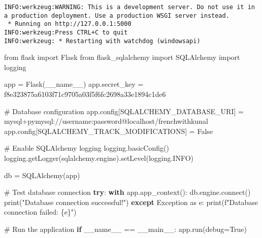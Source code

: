 \documentclass[
  letterpaper,
  DIV=11,
  numbers=noendperiod]{scrreprt}
\newenvironment{Shaded}{\begin{snugshade}}{\end{snugshade}}
\newcommand{\BuiltInTok}[1]{\textcolor[rgb]{0.00,0.23,0.31}{#1}}
\newcommand{\CommentTok}[1]{\textcolor[rgb]{0.37,0.37,0.37}{#1}}
\newcommand{\ControlFlowTok}[1]{\textcolor[rgb]{0.00,0.23,0.31}{\textbf{#1}}}
\newcommand{\ExtensionTok}[1]{\textcolor[rgb]{0.00,0.23,0.31}{#1}}
\newcommand{\ImportTok}[1]{\textcolor[rgb]{0.00,0.46,0.62}{#1}}
\newcommand{\NormalTok}[1]{\textcolor[rgb]{0.00,0.23,0.31}{#1}}
\newcommand{\OperatorTok}[1]{\textcolor[rgb]{0.37,0.37,0.37}{#1}}
\newcommand{\PreprocessorTok}[1]{\textcolor[rgb]{0.68,0.00,0.00}{#1}}
\newcommand{\SpecialCharTok}[1]{\textcolor[rgb]{0.37,0.37,0.37}{#1}}
\newcommand{\SpecialStringTok}[1]{\textcolor[rgb]{0.13,0.47,0.30}{#1}}
\newcommand{\StringTok}[1]{\textcolor[rgb]{0.13,0.47,0.30}{#1}}
\newcommand{\VariableTok}[1]{\textcolor[rgb]{0.07,0.07,0.07}{#1}}
\begin{document}
\begin{verbatim}
INFO:werkzeug:WARNING: This is a development server. Do not use it in a production deployment. Use a production WSGI server instead.
 * Running on http://127.0.0.1:5000
INFO:werkzeug:Press CTRL+C to quit
INFO:werkzeug: * Restarting with watchdog (windowsapi)
\end{verbatim}


\begin{Shaded}
\begin{Highlighting}[]
\ImportTok{from}\NormalTok{ flask }\ImportTok{import}\NormalTok{ Flask}
\ImportTok{from}\NormalTok{ flask\_sqlalchemy }\ImportTok{import}\NormalTok{ SQLAlchemy}
\ImportTok{import}\NormalTok{ logging}

\NormalTok{app }\OperatorTok{=}\NormalTok{ Flask(}\VariableTok{\_\_name\_\_}\NormalTok{)}
\NormalTok{app.secret\_key }\OperatorTok{=} \StringTok{\textquotesingle{}f8e323875a6103f71c9705a03f5f6fc2698a33e1894c1de6\textquotesingle{}}

\CommentTok{\# Database configuration}
\NormalTok{app.config[}\StringTok{\textquotesingle{}SQLALCHEMY\_DATABASE\_URI\textquotesingle{}}\NormalTok{] }\OperatorTok{=} \StringTok{\textquotesingle{}mysql+pymysql://username:password@localhost/frenchwithkunal\textquotesingle{}}
\NormalTok{app.config[}\StringTok{\textquotesingle{}SQLALCHEMY\_TRACK\_MODIFICATIONS\textquotesingle{}}\NormalTok{] }\OperatorTok{=} \VariableTok{False}

\CommentTok{\# Enable SQLAlchemy logging}
\NormalTok{logging.basicConfig()}
\NormalTok{logging.getLogger(}\StringTok{\textquotesingle{}sqlalchemy.engine\textquotesingle{}}\NormalTok{).setLevel(logging.INFO)}

\NormalTok{db }\OperatorTok{=}\NormalTok{ SQLAlchemy(app)}

\CommentTok{\# Test database connection}
\ControlFlowTok{try}\NormalTok{:}
    \ControlFlowTok{with}\NormalTok{ app.app\_context():}
\NormalTok{        db.engine.}\ExtensionTok{connect}\NormalTok{()}
        \BuiltInTok{print}\NormalTok{(}\StringTok{"Database connection successful!"}\NormalTok{)}
\ControlFlowTok{except} \PreprocessorTok{Exception} \ImportTok{as}\NormalTok{ e:}
    \BuiltInTok{print}\NormalTok{(}\SpecialStringTok{f"Database connection failed: }\SpecialCharTok{\{}\NormalTok{e}\SpecialCharTok{\}}\SpecialStringTok{"}\NormalTok{)}

\CommentTok{\# Run the application}
\ControlFlowTok{if} \VariableTok{\_\_name\_\_} \OperatorTok{==} \StringTok{\textquotesingle{}\_\_main\_\_\textquotesingle{}}\NormalTok{:}
\NormalTok{    app.run(debug}\OperatorTok{=}\VariableTok{True}\NormalTok{)}
\end{Highlighting}
\end{Shaded}
\end{document}
